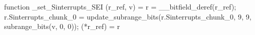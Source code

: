 function _set_Sinterrupts_SEI (r_ref, v) = {
    r = __bitfield_deref(r_ref);
    r.Sinterrupts_chunk_0 = update_subrange_bits(r.Sinterrupts_chunk_0, 9, 9, subrange_bits(v, 0, 0));
    (*r_ref) = r
}
